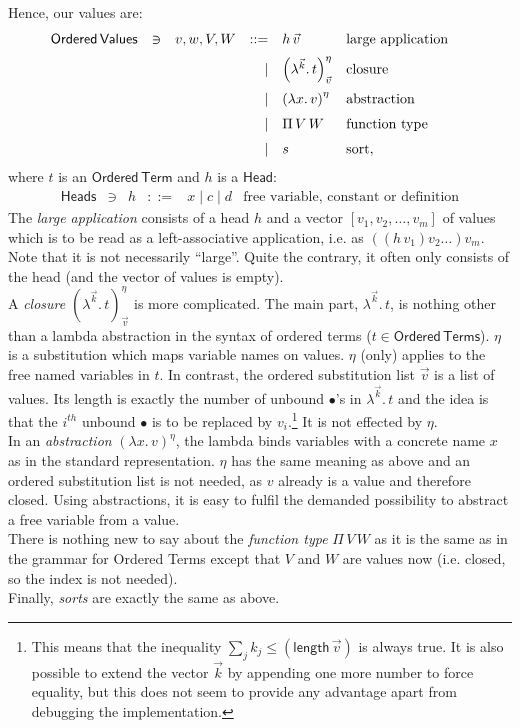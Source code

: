 \documentclass[12pt, a4paper, titlepage]{article}
\newcommand{\ovar}{\mathord{\bullet}}
\newcommand{\sspace}{\,}
\newcommand{\la}{\lambda}
\newcommand{\ve}[1]{[#1]}
\newcommand{\LaO}[2]{\la ^{#1} . \sspace #2}
\newcommand{\ClosO}[4]{\left(\la^{#1} . \sspace {#2} \right)^{#3}_{#4}}
\newcommand{\AbsO}[3]{\left( \la {#1}. \sspace {#2} \right)^{#3}}
\newcommand{\FunO}[2]{\Pi \sspace #1 \sspace #2}
\newcommand{\pa}[1]{\left( #1 \right)}
\newcommand{\head}{\mathsf{Head}}
\begin{document}
Hence, our values are: 
\[ 
\begin{array}{lllrll@{\qquad}}
\mathsf{Ordered\,Values}       & \ni & v,w,V,W & ::= & h \sspace \vec v & \mbox{large application} \\ 
\noalign{\medskip}
			                   &&& \mid & \ClosO {\vec k} t \eta {\vec v} & \mbox{closure} \\ 
\noalign{\medskip}
			                   &&& \mid & \AbsO x v \eta & \mbox{abstraction} \\
\noalign{\medskip}
			                   &&& \mid & \FunO V W & \mbox{function type} \\
\noalign{\medskip}
			                   &&& \mid & s & \mbox{sort},
\end{array}
\]
where $t$ is an $\mathsf{Ordered\,Term}$ and $h$ is a $\head$:
\[
\begin{array}{lllrll}
\mathsf{Heads}       & \ni & h & ::= & x \mid c \mid d & \mbox{free variable, constant or definition}  
\end{array}
\]
The \emph{large application} consists of a head $h$ and a vector $\ve{v_1, v_2, \ldots, v_m}$ of values which is to be read as a left-associative application, i.e. as $\pa{\pa{h \, v_1} v_2 \ldots } v_m$. 
Note that it is not necessarily ``large''. Quite the contrary, it often only consists of the head (and the vector of values is empty).\\
A \emph{closure} $\ClosO {\vec k} t \eta {\vec v}$ is more complicated. The main part, $\LaO {\vec k} t$, is nothing other than a lambda abstraction in the syntax of ordered terms ($t \in \mathsf{Ordered\,Terms}$). $\eta$ is a substitution which maps variable names on values. $\eta$ (only) applies to the free named variables in $t$. In contrast, the ordered substitution list $\vec v$ is a list of values. Its length is exactly the number of unbound $\ovar$'s in $\LaO {\vec k} t$ and the idea is that the $i^{th}$ unbound $\ovar$ is to be replaced by $v_i$.\footnote{This means that the inequality $\sum_{j} k_j \leq \pa{\mathsf{length}\, \vec v}$ is always true. 
It is also possible to extend the vector $\vec k$ by appending one more number to force equality, but this does not seem to provide any advantage apart from debugging the implementation.} It is not effected by $\eta$.
\\
In an \emph{abstraction} $\AbsO x v \eta$, the lambda binds variables with a concrete name $x$ as in the standard representation. $\eta$ has the same meaning as above and an ordered substitution list is not needed, as $v$ already is a value and therefore closed. Using abstractions, it is easy to fulfil the demanded possibility to abstract a free variable from a value.
\\
There is nothing new to say about the \emph{function type} $\FunO V W$ as it is the same as in the grammar for Ordered Terms except that $V$ and $W$ are values now (i.e. closed, so the index is not needed).\\
Finally, \emph{sorts} are exactly the same as above.
\end{document}
